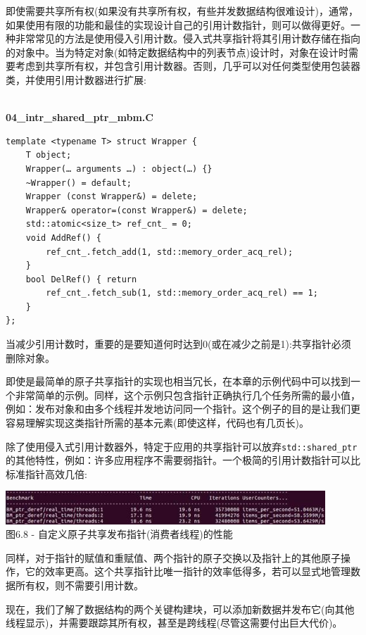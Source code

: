 即使需要共享所有权(如果没有共享所有权，有些并发数据结构很难设计)，通常，如果使用有限的功能和最佳的实现设计自己的引用计数指针，则可以做得更好。一种非常常见的方法是使用侵入引用计数。侵入式共享指针将其引用计数存储在指向的对象中。当为特定对象(如特定数据结构中的列表节点)设计时，对象在设计时需要考虑到共享所有权，并包含引用计数器。否则，几乎可以对任何类型使用包装器类，并使用引用计数器进行扩展:

\hspace*{\fill} \\ %
\noindent
\textbf{04\_intr\_shared\_ptr\_mbm.C}
\begin{lstlisting}[style=styleCXX]
template <typename T> struct Wrapper {
	T object;
	Wrapper(… arguments …) : object(…) {}
	~Wrapper() = default;
	Wrapper (const Wrapper&) = delete;
	Wrapper& operator=(const Wrapper&) = delete;
	std::atomic<size_t> ref_cnt_ = 0;
	void AddRef() {
		ref_cnt_.fetch_add(1, std::memory_order_acq_rel);
	}
	bool DelRef() { return
		ref_cnt_.fetch_sub(1, std::memory_order_acq_rel) == 1;
	}
};
\end{lstlisting}

当减少引用计数时，重要的是要知道何时达到0(或在减少之前是1):共享指针必须删除对象。

即使是最简单的原子共享指针的实现也相当冗长，在本章的示例代码中可以找到一个非常简单的示例。同样，这个示例只包含指针正确执行几个任务所需的最小值，例如：发布对象和由多个线程并发地访问同一个指针。这个例子的目的是让我们更容易理解实现这类指针所需的基本元素(即使这样，代码也有几页长)。

除了使用侵入式引用计数器外，特定于应用的共享指针可以放弃\texttt{std::shared\_ptr}的其他特性，例如：许多应用程序不需要弱指针。一个极简的引用计数指针可以比标准指针高效几倍:

\begin{center}
\includegraphics[width=0.9\textwidth]{content/2/chapter6/images/8.jpg}\\
图6.8 - 自定义原子共享发布指针(消费者线程)的性能
\end{center}

同样，对于指针的赋值和重赋值、两个指针的原子交换以及指针上的其他原子操作，它的效率更高。这个共享指针比唯一指针的效率低得多，若可以显式地管理数据所有权，则不需要引用计数。

现在，我们了解了数据结构的两个关键构建块，可以添加新数据并发布它(向其他线程显示)，并需要跟踪其所有权，甚至是跨线程(尽管这需要付出巨大代价)。




















